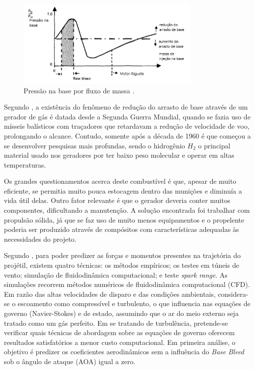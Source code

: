 \begin{figure}[!ht]
	\centering
	\includegraphics[width=0.8\textwidth]{foto04-grafico-andersson1976.png}
	\caption[Pressão na base por fluxo de massa.]{Pressão na base por fluxo de massa \cite{Andersson1976}.}
	\label{fig4:andersson1976}
\end{figure}

Segundo \citeauthor{Jelic2016Aug}, a existência do fenômeno de redução do arrasto de base através de um gerador de gás é datada desde a Segunda Guerra Mundial, quando se fazia uso de mísseis balísticos com traçadores que retardavam a redução de velocidade de voo, prolongando o alcance. Contudo, somente após a década de 1960 é que começou a se desenvolver pesquisas mais profundas, sendo o hidrogênio \(H_2\) o principal material usado nos geradores por ter baixo peso molecular e operar em altas temperaturas.

Os grandes questionamentos acerca deste combustível é que, apesar de muito eficiente, se permitia muito pouca estocagem dentro das munições e diminuía a vida útil delas. Outro fator relevante é que o gerador deveria conter muitos componentes, dificultando a manutenção. A solução encontrada foi trabalhar com propulsão sólida, já que se faz uso de muito menos equipamentos e o propelente poderia ser produzido através de compósitos com características adequadas às necessidades do projeto.

Segundo \citeauthor{Mahmoud2009}, para poder predizer as forças e momentos presentes na trajetória do projétil, existem quatro técnicas: os métodos empíricos; os testes em túneis de vento; simulação de fluidodinâmica computacional; e teste \textit{spark range}. As simulações recorrem métodos numéricos de fluidodinâmica computacional (CFD). Em razão das altas velocidades de disparo e das condições ambientais, considera-se o escoamento como compressível e turbulento, o que influencia nas equações de governo (Navier-Stokes) e de estado, assumindo que o ar do meio externo seja tratado como um gás perfeito. Em se tratando de turbulência, pretende-se verificar quais técnicas de abordagem sobre as equações de governo oferecem resultados satisfatórios a menor custo computacional. Em primeira análise, o objetivo é predizer os coeficientes aerodinâmicos sem a influência do \textit{Base Bleed} sob o ângulo de ataque (AOA) igual a zero.

